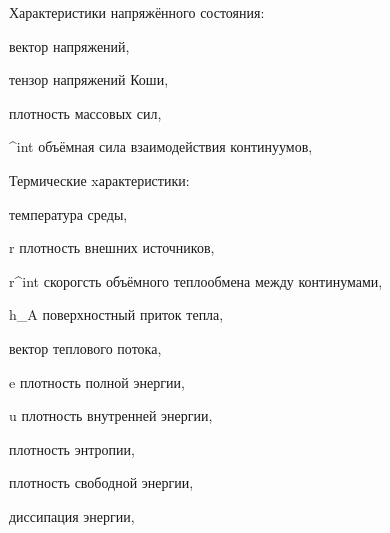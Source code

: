 	Характеристики напряжённого состояния:
\begin{where}
	\item [\boldsymbol{t}] вектор напряжений,
	\item [\boldsymbol{\sigma}] тензор напряжений Коши,
	\item [\boldsymbol{b}] плотность массовых сил,
	\item [\boldsymbol{b}^{int}] объёмная сила взаимодействия континуумов,
\end{where}

	Термические xарактеристики:
\begin{where}
	\item [\theta] температура среды,
	\item [r] плотность внешних источников,
	\item [r^{int}] скорогсть объёмного теплообмена между континумами,
	\item [h_A] поверхностный приток тепла,
	\item [\boldsymbol{q}] вектор теплового потока,
	\item [e] плотность полной энергии,
	\item [u] плотность внутренней энергии,
	\item [\eta] плотность энтропии,
	\item [\psi] плотность свободной энергии,
	\item [\delta] диссипация энергии,
\end{where}

